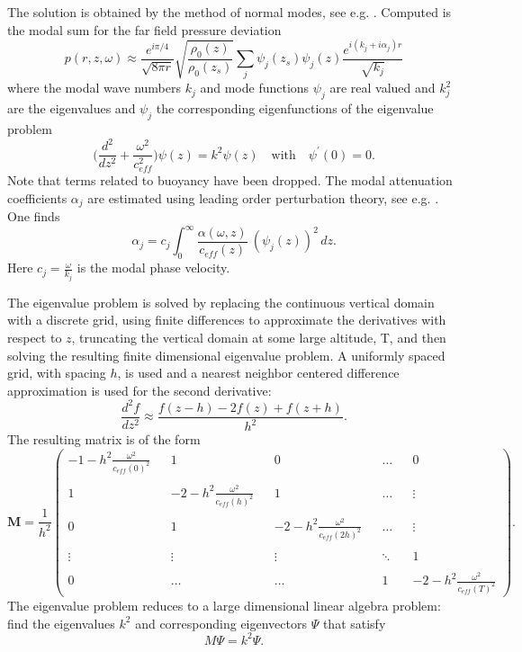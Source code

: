 The solution is obtained by the method of normal modes, see e.g. \cite{comp_oc_ac}. Computed is the modal sum for the far field pressure deviation 
\begin{equation}
p(r,z,\omega)
\approx
\frac{e^{i \pi /4}}{\sqrt{8 \pi r}} \sqrt{\frac {\rho_0(z)} {\rho_0(z_s)}} \sum_j\psi_j(z_s)\psi_j(z) \frac{e^{i (k_j+i\alpha_j)r}}{\sqrt{k_j}}
\label{eq: modess far field pressure}
\end{equation}
where the modal wave numbers $k_j$ and mode functions $\psi_j$ are real valued and $k_j^2$ are the eigenvalues and $\psi_j$ the corresponding eigenfunctions of the eigenvalue problem 
\[
\Big( 
\frac{d^2}{dz^2} +\frac{\omega^2}{c_{eff}^2}
\Big)\psi(z) 
= 
k^2\psi(z) 
\quad \text{with} \quad 
\psi^\prime(0)=0. 
\]
Note that terms related to buoyancy have been dropped. The modal attenuation coefficients $\alpha_j$ are estimated using leading order perturbation theory, see e.g. \cite{Landau_QM}. One finds 
\[
\alpha_j=c_j\int_0^\infty \frac{\alpha(\omega,z)}{c_{eff}(z)}\ (\psi_j(z))^2\, dz. 
\]
Here $c_j=\frac{\omega}{k_j}$ is the modal phase velocity. 

The eigenvalue problem is solved by replacing the continuous vertical domain with a discrete grid, using finite differences to approximate the derivatives with respect to $z$, truncating the vertical domain at some large altitude, T, and then solving the resulting finite dimensional eigenvalue problem. A uniformly spaced grid, with spacing $h$, is used and a nearest neighbor centered difference approximation is used for the second derivative: 
\[
\frac{d^2f}{dz^2}\approx \frac{f(z-h)-2f(z)+f(z+h)}{h^2}. 
\]
The resulting matrix is of the form
\[
\textbf{M}
=
\frac{1}{h^2}\begin{pmatrix}
-1 - h^2\frac{\omega^2}{c_{eff}(0)^2} && 1 && 0 && \hdots && 0\\ \\
1 && -2 - h^2\frac{\omega^2}{c_{eff}(h)^2}&& 1 && \hdots && \vdots\\ \\
0 && 1 && -2  - h^2\frac{\omega^2}{c_{eff}(2h)^2}&& \hdots && \vdots\\ \\
\vdots && \vdots && \vdots && \ddots && 1 \\ \\
0 && \hdots && \hdots && 1 && -2  - h^2\frac{\omega^2}{c_{eff}(T)^2}
\end{pmatrix}.
\]
The eigenvalue problem reduces to a large dimensional linear algebra problem: find the eigenvalues $k^2$ and corresponding eigenvectors $\Psi$ that satisfy 
\[
M\Psi=k^2\Psi. 
\]

